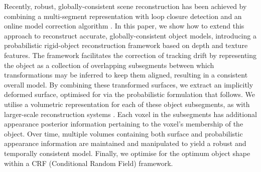 
Recently, robust, globally-consistent scene reconstruction has been achieved by combining a multi-segment representation with loop closure detection and an online model correction algorithm \cite{Kahler2016}. In this paper, we show how to extend this approach to reconstruct accurate, globally-consistent object models, introducing a probabilistic rigid-object reconstruction framework based on 
depth and texture features. The framework facilitates the correction of tracking drift by representing the object as a
collection of overlapping subsegments between which transformations may be inferred to keep them aligned, resulting in a consistent
overall model. By combining these transformed surfaces, we extract an implicitly deformed surface, optimised for via the probabilistic formulation 
that follows. We utilise a volumetric representation for each of these object subsegments, as with larger-scale reconstruction
systems \cite{Kahler2016}. Each voxel in the subsegments has additional appearance posterior information pertaining to the voxel's membership 
of the object. Over time, multiple volumes containing both surface and probabilistic appearance information are maintained and manipulated to 
yield a robust and temporally consistent model. Finally, we optimise for the optimum object shape within a CRF (Conditional Random Field) framework.

